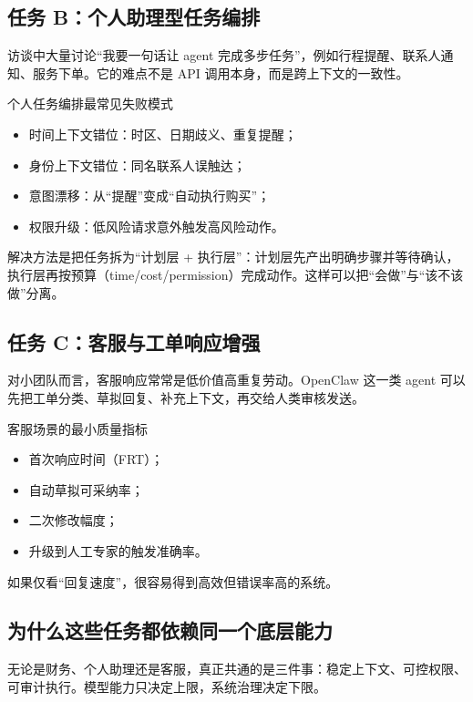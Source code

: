\documentclass[a4paper]{article}
\begin{document}
\subsection{任务 B：个人助理型任务编排}

访谈中大量讨论“我要一句话让 agent 完成多步任务”，例如行程提醒、联系人通知、服务下单。它的难点不是 API 调用本身，而是跨上下文的一致性。

\begin{warningbox}{个人任务编排最常见失败模式}
\begin{itemize}
    \item 时间上下文错位：时区、日期歧义、重复提醒；
    \item 身份上下文错位：同名联系人误触达；
    \item 意图漂移：从“提醒”变成“自动执行购买”；
    \item 权限升级：低风险请求意外触发高风险动作。
\end{itemize}
\end{warningbox}

解决方法是把任务拆为“计划层 + 执行层”：计划层先产出明确步骤并等待确认，执行层再按预算（time/cost/permission）完成动作。这样可以把“会做”与“该不该做”分离。

\subsection{任务 C：客服与工单响应增强}

对小团队而言，客服响应常常是低价值高重复劳动。OpenClaw 这一类 agent 可以先把工单分类、草拟回复、补充上下文，再交给人类审核发送。

\begin{knowledgebox}{客服场景的最小质量指标}
\begin{itemize}
    \item 首次响应时间（FRT）；
    \item 自动草拟可采纳率；
    \item 二次修改幅度；
    \item 升级到人工专家的触发准确率。
\end{itemize}
如果仅看“回复速度”，很容易得到高效但错误率高的系统。
\end{knowledgebox}

\subsection{为什么这些任务都依赖同一个底层能力}

无论是财务、个人助理还是客服，真正共通的是三件事：稳定上下文、可控权限、可审计执行。模型能力只决定上限，系统治理决定下限。
\end{document}
